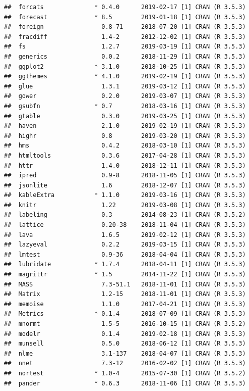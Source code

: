 \documentclass[12pt,openany]{book}
\begin{document}
\begin{verbatim}
##  forcats              * 0.4.0      2019-02-17 [1] CRAN (R 3.5.3)
##  forecast             * 8.5        2019-01-18 [1] CRAN (R 3.5.3)
##  foreign                0.8-71     2018-07-20 [1] CRAN (R 3.5.3)
##  fracdiff               1.4-2      2012-12-02 [1] CRAN (R 3.5.3)
##  fs                     1.2.7      2019-03-19 [1] CRAN (R 3.5.3)
##  generics               0.0.2      2018-11-29 [1] CRAN (R 3.5.3)
##  ggplot2              * 3.1.0      2018-10-25 [1] CRAN (R 3.5.3)
##  ggthemes             * 4.1.0      2019-02-19 [1] CRAN (R 3.5.3)
##  glue                   1.3.1      2019-03-12 [1] CRAN (R 3.5.3)
##  gower                  0.2.0      2019-03-07 [1] CRAN (R 3.5.3)
##  gsubfn               * 0.7        2018-03-16 [1] CRAN (R 3.5.3)
##  gtable                 0.3.0      2019-03-25 [1] CRAN (R 3.5.3)
##  haven                  2.1.0      2019-02-19 [1] CRAN (R 3.5.3)
##  highr                  0.8        2019-03-20 [1] CRAN (R 3.5.3)
##  hms                    0.4.2      2018-03-10 [1] CRAN (R 3.5.3)
##  htmltools              0.3.6      2017-04-28 [1] CRAN (R 3.5.3)
##  httr                   1.4.0      2018-12-11 [1] CRAN (R 3.5.3)
##  ipred                  0.9-8      2018-11-05 [1] CRAN (R 3.5.3)
##  jsonlite               1.6        2018-12-07 [1] CRAN (R 3.5.3)
##  kableExtra           * 1.1.0      2019-03-16 [1] CRAN (R 3.5.3)
##  knitr                  1.22       2019-03-08 [1] CRAN (R 3.5.3)
##  labeling               0.3        2014-08-23 [1] CRAN (R 3.5.2)
##  lattice                0.20-38    2018-11-04 [1] CRAN (R 3.5.3)
##  lava                   1.6.5      2019-02-12 [1] CRAN (R 3.5.3)
##  lazyeval               0.2.2      2019-03-15 [1] CRAN (R 3.5.3)
##  lmtest                 0.9-36     2018-04-04 [1] CRAN (R 3.5.3)
##  lubridate            * 1.7.4      2018-04-11 [1] CRAN (R 3.5.3)
##  magrittr             * 1.5        2014-11-22 [1] CRAN (R 3.5.3)
##  MASS                   7.3-51.1   2018-11-01 [1] CRAN (R 3.5.3)
##  Matrix                 1.2-15     2018-11-01 [1] CRAN (R 3.5.3)
##  memoise                1.1.0      2017-04-21 [1] CRAN (R 3.5.3)
##  Metrics              * 0.1.4      2018-07-09 [1] CRAN (R 3.5.3)
##  mnormt                 1.5-5      2016-10-15 [1] CRAN (R 3.5.2)
##  modelr                 0.1.4      2019-02-18 [1] CRAN (R 3.5.3)
##  munsell                0.5.0      2018-06-12 [1] CRAN (R 3.5.3)
##  nlme                   3.1-137    2018-04-07 [1] CRAN (R 3.5.3)
##  nnet                   7.3-12     2016-02-02 [1] CRAN (R 3.5.3)
##  nortest              * 1.0-4      2015-07-30 [1] CRAN (R 3.5.2)
##  pander               * 0.6.3      2018-11-06 [1] CRAN (R 3.5.3)

\end{verbatim}
\end{document}
